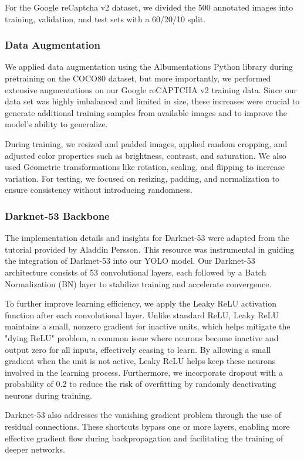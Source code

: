 \documentclass{article}
\begin{document}
For the Google reCaptcha v2 dataset, we divided the 500 annotated images into training, validation, and test sets with a 60/20/10 split.

\subsubsection{Data Augmentation}
We applied data augmentation using the Albumentations Python library during pretraining on the COCO80 dataset, but more importantly, we performed extensive augmentations on our Google reCAPTCHA v2 training data. Since our data set was highly imbalanced and limited in size, these increases were crucial to generate additional training samples from available images and to improve the model's ability to generalize.

During training, we resized and padded images, applied random cropping, and adjusted color properties such as brightness, contrast, and saturation. We also used Geometric transformations like rotation, scaling, and flipping to increase variation. For testing, we focused on resizing, padding, and normalization to ensure consistency without introducing randomness.

\subsubsection{Darknet-53 Backbone}
The implementation details and insights for Darknet-53 were adapted from the tutorial provided by Aladdin Persson. \cite{persson2021darknet53} This resource was instrumental in guiding the integration of Darknet-53 into our YOLO model. Our Darknet-53 architecture consists of 53 convolutional layers, each followed by a Batch Normalization (BN) layer to stabilize training and accelerate convergence.

To further improve learning efficiency, we apply the Leaky ReLU activation function after each convolutional layer. Unlike standard ReLU, Leaky ReLU maintains a small, nonzero gradient for inactive units, which helps mitigate the "dying ReLU" problem, a common issue where neurons become inactive and output zero for all inputs, effectively ceasing to learn. By allowing a small gradient when the unit is not active, Leaky ReLU helps keep these neurons involved in the learning process. Furthermore, we incorporate dropout with a probability of 0.2 to reduce the risk of overfitting by randomly deactivating neurons during training.

Darknet-53 also addresses the vanishing gradient problem through the use of residual connections. These shortcuts bypass one or more layers, enabling more effective gradient flow during backpropagation and facilitating the training of deeper networks.
\end{document}
